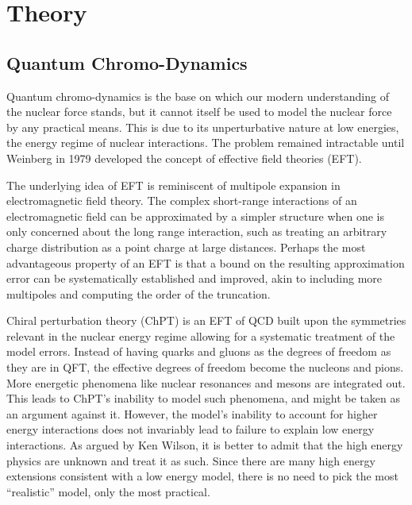 \section{Theory}\label{sec:Theory}

\newcommand{\state}{\ket{\psi}}
\newcommand{\hoket}{\ket{\phi}}
\newcommand{\hoep}{\ket{\phi +}}
\newcommand{\hoem}{\ket{\phi -}}
\newcommand{\pin}{\psi_\text{in}}
\newcommand{\pout}{\psi_\text{out}}
\newcommand{\kpin}{\ket{\psi_\text{in}}}
\newcommand{\kpout}{\ket{\psi_\text{out}}}
\newcommand{\mop}{\Omega_{+}}
\newcommand{\mom}{\Omega_{-}}
\newcommand{\melt}[3]{\left|\mel{#1}{#2}{#3}\right|^{2}}
\newcommand{\scat}{\mathcal{S}}
\newcommand{\mscat}{\(\scat\)}
\newcommand{\oop}[1]{\mathcal{#1}}
\newcommand{\moop}[1]{\(\oop{#1}\)}
\renewcommand{\vu}[1]{\mathbf{\hat{\text{$#1$}}}}

\subsection{Quantum Chromo-Dynamics}

Quantum chromo-dynamics is the base on which our modern understanding of the
nuclear force stands, but it cannot itself be used to model the nuclear force
by any practical means. This is due to its unperturbative nature at low energies, the energy regime of
nuclear interactions. The problem remained intractable until Weinberg in
1979 developed the concept of effective field theories (EFT)\cite{Weinberg1979}.

The underlying idea of EFT is reminiscent of multipole expansion in
electromagnetic field
theory. The complex short-range interactions of an electromagnetic field can be
approximated by a simpler structure when one is only concerned about the long
range interaction, such as treating an arbitrary charge distribution as a point
charge at large distances. Perhaps the most advantageous property of an EFT is
that a bound on the resulting approximation error can be systematically
established and improved, akin to including more multipoles and computing the
order of the truncation.

Chiral perturbation theory (ChPT) is an EFT of QCD built upon the symmetries relevant
in the nuclear energy regime allowing for a systematic treatment of the model
errors. Instead of having quarks and gluons as the degrees of freedom as they
are in QFT, the
effective degrees of freedom become the nucleons and pions. More energetic
phenomena like nuclear
resonances and mesons are integrated out\cite[p.~11]{EPELBAUM2012343}. This leads to ChPT's
inability to model such phenomena, and might be taken as an argument against it.
However, the model's inability to account for higher energy interactions does
not invariably lead to failure to explain low energy interactions. As argued by Ken
Wilson, it is better to admit that the high energy physics are unknown and treat
it as such. Since there are many high energy extensions consistent with a low energy
model, there is no need to pick the most ``realistic'' model, only the most practical.

